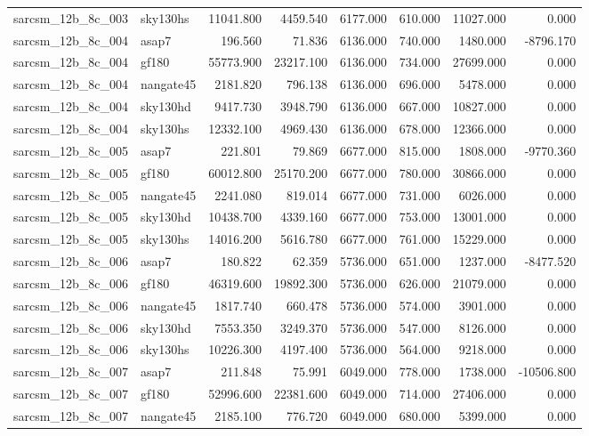 \begin{tabular}{llrrrrrr}
sarcsm\_12b\_8c\_003 & sky130hs & 11041.800 & 4459.540 & 6177.000 & 610.000 & 11027.000 & 0.000 \\
sarcsm\_12b\_8c\_004 & asap7 & 196.560 & 71.836 & 6136.000 & 740.000 & 1480.000 & -8796.170 \\
sarcsm\_12b\_8c\_004 & gf180 & 55773.900 & 23217.100 & 6136.000 & 734.000 & 27699.000 & 0.000 \\
sarcsm\_12b\_8c\_004 & nangate45 & 2181.820 & 796.138 & 6136.000 & 696.000 & 5478.000 & 0.000 \\
sarcsm\_12b\_8c\_004 & sky130hd & 9417.730 & 3948.790 & 6136.000 & 667.000 & 10827.000 & 0.000 \\
sarcsm\_12b\_8c\_004 & sky130hs & 12332.100 & 4969.430 & 6136.000 & 678.000 & 12366.000 & 0.000 \\
sarcsm\_12b\_8c\_005 & asap7 & 221.801 & 79.869 & 6677.000 & 815.000 & 1808.000 & -9770.360 \\
sarcsm\_12b\_8c\_005 & gf180 & 60012.800 & 25170.200 & 6677.000 & 780.000 & 30866.000 & 0.000 \\
sarcsm\_12b\_8c\_005 & nangate45 & 2241.080 & 819.014 & 6677.000 & 731.000 & 6026.000 & 0.000 \\
sarcsm\_12b\_8c\_005 & sky130hd & 10438.700 & 4339.160 & 6677.000 & 753.000 & 13001.000 & 0.000 \\
sarcsm\_12b\_8c\_005 & sky130hs & 14016.200 & 5616.780 & 6677.000 & 761.000 & 15229.000 & 0.000 \\
sarcsm\_12b\_8c\_006 & asap7 & 180.822 & 62.359 & 5736.000 & 651.000 & 1237.000 & -8477.520 \\
sarcsm\_12b\_8c\_006 & gf180 & 46319.600 & 19892.300 & 5736.000 & 626.000 & 21079.000 & 0.000 \\
sarcsm\_12b\_8c\_006 & nangate45 & 1817.740 & 660.478 & 5736.000 & 574.000 & 3901.000 & 0.000 \\
sarcsm\_12b\_8c\_006 & sky130hd & 7553.350 & 3249.370 & 5736.000 & 547.000 & 8126.000 & 0.000 \\
sarcsm\_12b\_8c\_006 & sky130hs & 10226.300 & 4197.400 & 5736.000 & 564.000 & 9218.000 & 0.000 \\
sarcsm\_12b\_8c\_007 & asap7 & 211.848 & 75.991 & 6049.000 & 778.000 & 1738.000 & -10506.800 \\
sarcsm\_12b\_8c\_007 & gf180 & 52996.600 & 22381.600 & 6049.000 & 714.000 & 27406.000 & 0.000 \\
sarcsm\_12b\_8c\_007 & nangate45 & 2185.100 & 776.720 & 6049.000 & 680.000 & 5399.000 & 0.000 \\

\end{tabular}
